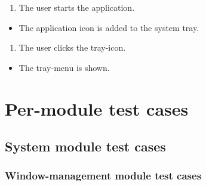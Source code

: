 \begin{tests}
    {\begin{enumerate}
        \item The \gls{user} starts the application.
    \end{enumerate}}
    {\begin{itemize}
        \item The application icon is added to the system tray.
    \end{itemize}}

    {\begin{enumerate}
        \item The \gls{user} clicks the tray-icon.
    \end{enumerate}}
    {\begin{itemize}
        \item The tray-menu is shown.
    \end{itemize}}
\end{tests}

\section{Per-module test cases}

\subsection{System module test cases}

\subsubsection{Window-management module test cases}

